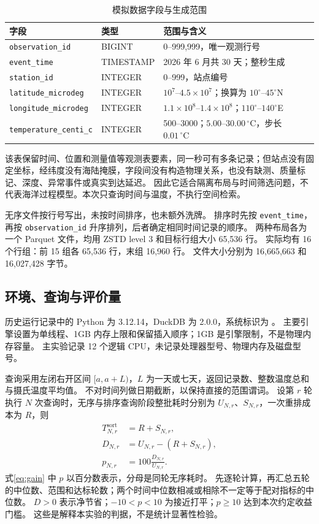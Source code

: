 \documentclass[UTF8,a4paper,zihao=-4,fontset=none]{ctexart}
\newcommand{\code}[1]{{\small\texttt{#1}}}
\begin{document}
\begin{table}[htbp]
\centering\small
\caption{模拟数据字段与生成范围}\label{tab:fields}
\begin{tabularx}{\linewidth}{@{}l l Y@{}}
\toprule
字段 & 类型 & 范围与含义\\
\midrule
\code{observation\_id} & BIGINT & 0--999,999，唯一观测行号\\
\code{event\_time} & TIMESTAMP & 2026 年 6 月共 30 天；整秒生成\\
\code{station\_id} & INTEGER & 0--999，站点编号\\
\code{latitude\_microdeg} & INTEGER & $10^7$--$4.5\times10^7$；换算为 $10^\circ$--$45^\circ$N\\
\code{longitude\_microdeg} & INTEGER & $1.1\times10^8$--$1.4\times10^8$；$110^\circ$--$140^\circ$E\\
\code{temperature\_centi\_c} & INTEGER & 500--3000；$5.00$--$30.00\,{}^\circ\mathrm C$，步长 $0.01\,{}^\circ\mathrm C$\\
\bottomrule
\end{tabularx}
\end{table}

该表保留时间、位置和测量值等观测表要素，同一秒可有多条记录；但站点没有固定坐标，经纬度没有海陆掩膜，字段间没有构造物理关系，也没有缺测、质量标记、深度、异常事件或真实到达延迟。
因此它适合隔离布局与时间筛选问题，不代表海洋过程模型。本次只查询时间与温度，不执行空间检索。

无序文件按行号写出，未按时间排序，也未额外洗牌。
排序时先按 \code{event\_time}，再按 \code{observation\_id} 升序排列，后者确定相同时间记录的顺序。
两种布局各为一个 Parquet 文件，均用 ZSTD level 3 和目标行组大小 65,536 行。
实际均有 16 个行组：前 15 组各 65,536 行，末组 16,960 行。
文件大小分别为 16,665,663 和 16,027,428 字节。

\subsection{环境、查询与评价量}
历史运行记录中的 Python 为 3.12.14，DuckDB 为 2.0.0，系统标识为
。
主要引擎设置为单线程、1GB 内存上限和保留插入顺序；1GB 是引擎限制，不是物理内存容量。
主实验记录 12 个逻辑 CPU，未记录处理器型号、物理内存及磁盘型号。

查询采用左闭右开区间 $[a,a+L)$，$L$ 为一天或七天，返回记录数、整数温度总和与摄氏温度平均值。
不对时间列做日期截断，以保持直接的范围谓词。
设第 $r$ 轮执行 $N$ 次查询时，无序与排序查询阶段整批耗时分别为 $U_{N,r}$、$S_{N,r}$，一次重排成本为 $R$，则
\begin{align}
T^{\mathrm{sort}}_{N,r}&=R+S_{N,r},\label{eq:cost}\\
D_{N,r}&=U_{N,r}-(R+S_{N,r}),\label{eq:net}\\
p_{N,r}&=100\frac{D_{N,r}}{U_{N,r}}.\label{eq:gain}
\end{align}
式\eqref{eq:gain} 中 $p$ 以百分数表示，分母是同轮无序耗时。
先逐轮计算，再汇总五轮的中位数、范围和达标轮数；两个时间中位数相减或相除不一定等于配对指标的中位数。
$D>0$ 表示净节省；$-10<p<10$ 为接近打平；$p\ge10$ 达到本次约定收益门槛。
这些是解释本实验的判据，不是统计显著性检验。
\end{document}
